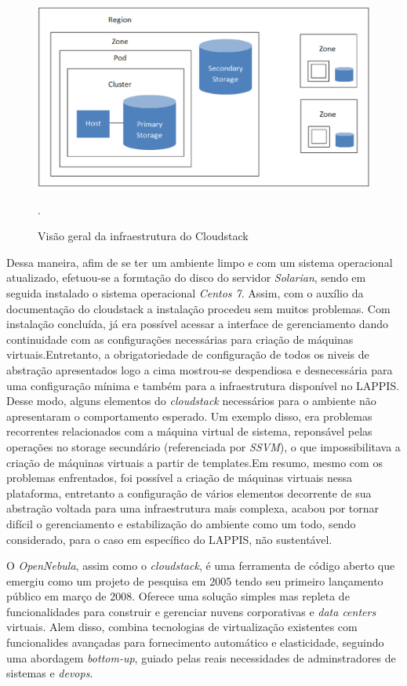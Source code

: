\begin{figure}[!htb]
\centering
\includegraphics [keepaspectratio=true,scale=0.60]{figuras/cloudstack_structure.eps}
\caption{Visão geral da infraestrutura do Cloudstack}
\cite{cloudstack}.
\label{diagramacloudstack}
\end{figure}

Dessa maneira, afim de se ter um ambiente limpo e com um sistema operacional atualizado, efetuou-se a formtação do disco do servidor \textit{Solarian}, sendo em seguida instalado o sistema operacional \textit{Centos 7}. Assim, com o auxílio da documentação do cloudstack a instalação procedeu sem muitos problemas. Com instalação concluída, já era possível acessar a interface de gerenciamento dando continuidade com as configurações necessárias para criação de máquinas virtuais.Entretanto, a obrigatoriedade de configuração de todos os niveis de abstração apresentados logo a cima mostrou-se despendiosa e desnecessária para uma configuração mínima e também para a infraestrutura disponível no LAPPIS. Desse modo, alguns elementos do \textit{cloudstack} necessários para o ambiente não apresentaram o comportamento esperado. Um exemplo disso, era problemas recorrentes relacionados com a máquina virtual de sistema, reponsável pelas operações no storage secundário (referenciada por \textit{SSVM}), o que impossibilitava a criação de máquinas virtuais a partir de templates.Em resumo, mesmo com os problemas enfrentados, foi possível a criação de máquinas virtuais nessa plataforma, entretanto a configuração de vários elementos decorrente de sua abstração voltada para uma infraestrutura mais complexa, acabou por tornar difícil o gerenciamento e estabilização do ambiente como um todo, sendo considerado, para o caso em específico do LAPPIS, não sustentável.

O \textit{OpenNebula}, assim como o \textit{cloudstack}, é uma ferramenta de código aberto que emergiu como um projeto de pesquisa em 2005 tendo seu primeiro lançamento público em março de 2008. Oferece uma solução simples mas repleta de funcionalidades para construir e gerenciar nuvens corporativas e \textit{data centers} virtuais. Alem disso, combina tecnologias de virtualização existentes com funcionalides avançadas para fornecimento automático e elasticidade, seguindo uma abordagem \textit{bottom-up}, guiado pelas reais necessidades de adminstradores de sistemas e \textit{devops}\cite{opennebula}.

